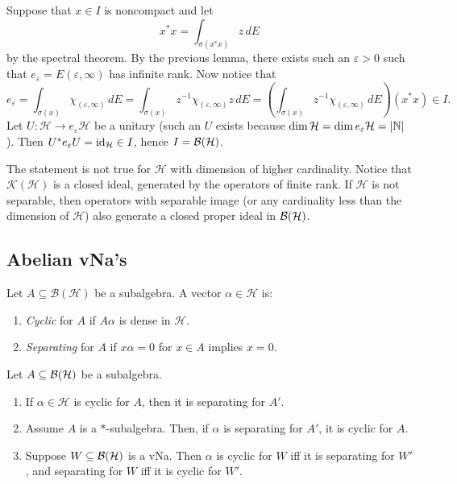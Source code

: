 \begin{myproof}
  Suppose that $x \in I$ is noncompact and let 
  $$x^* x = \int_{\sigma(x^* x)} z\, dE$$
  by the spectral theorem. By the previous lemma, there exists such an $\varepsilon > 0$ such that 
  $e_{\varepsilon} = E(\varepsilon, \infty)$ has infinite rank. Now notice that 
  $$e_\varepsilon = \int_{\sigma(x)} \chi_{(\varepsilon, \infty)}\, dE = \int_{\sigma(x)} z^{-1} \chi_{(\varepsilon, \infty)} z\, dE = \left(\int_{\sigma(x)} z^{-1} \chi_{(\varepsilon, \infty)}\, dE\right) (x^* x) \in I.$$
  Let $U: \mathcal{H}\to e_{\varepsilon} \mathcal{H}$ be a unitary (such an $U$ exists because $\dim \mathcal{H} = \dim e_\varepsilon \mathcal{H} = |\mathbb {N}|$).
  Then $U^* e_\varepsilon U = \operatorname{id}_{\mathcal{H}} \in I$, hence $I = \operatorname{\mathcal{B} (\mathcal{H})}$.
\end{myproof}

\begin{remark}
  The statement is not true for $\mathcal{H}$ with dimension of higher cardinality. 
  Notice that $\mathcal{K}(\mathcal{H})$ is a closed ideal, generated by the operators of finite rank.
  If $\mathcal{H}$ is not separable, then operators with separable image (or any cardinality less than the dimension of $\mathcal{H}$) 
  also generate a closed proper ideal in $\operatorname{\mathcal{B} (\mathcal{H})}$.
\end{remark}

\subsection{Abelian vNa's}

\begin{definition}
  Let $A \subseteq \mathcal{B}(\mathcal{H})$ be a subalgebra. A vector $\alpha \in \mathcal{H}$ is:
  \begin{enumerate}
    \item \emph{Cyclic} for $A$ if $A \alpha$ is dense in $\mathcal{H}$.
    \item \emph{Separating} for $A$ if $x \alpha = 0$ for $x \in A$ implies $x = 0$.
  \end{enumerate}
\end{definition}

\begin{proposition}
  Let $A \subseteq \operatorname{\mathcal{B} (\mathcal{H})}$ be a subalgebra.
  \begin{enumerate}
    \item If $\alpha \in \mathcal{H}$ is cyclic for $A$, then it is separating for $A'$.
    \item Assume $A$ is a $*$-subalgebra. Then, if $\alpha$ is separating for $A'$, it is cyclic for $A$.
    \item Suppose $W \subseteq \operatorname{\mathcal{B} (\mathcal{H})}$ is a vNa. Then $\alpha$ is cyclic for $W$ iff it is separating for $W'$,
    and separating for $W$ iff it is cyclic for $W'$.
  \end{enumerate}
\end{proposition}

